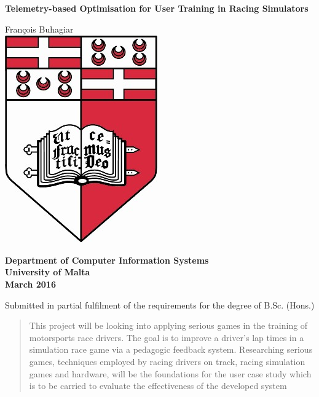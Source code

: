 \documentclass{article}
\begin{document}
\begin{titlepage}
	\begin{center}
		\begin{spacing}{1.5}
			\huge{\textbf{Telemetry-based Optimisation for User Training in Racing Simulators}}
		\end{spacing}
		
		\LARGE{François Buhagiar}
		\vspace{5mm}\\
		\includegraphics[scale=4]{images/UOM_Logo}
		
		\begin{spacing}{1.5}
			\huge{\textbf{Department of Computer Information Systems\\
			\vspace{5mm}
				University of Malta\\
				March 2016 }}
		\end{spacing}
	
		\Large \vfill Submitted in partial fulfilment of the requirements for the degree of B.Sc. (Hons.)
		\clearpage
	\end{center}
\end{titlepage}


\newpage
{} 
\setcounter{page}{1}

\newpage
\begin{abstract}
This project will be looking into applying serious games in the training of motorsports race drivers. The goal is to improve a driver's lap times in a simulation race game via a pedagogic feedback system. Researching serious games, techniques employed by racing drivers on track, racing simulation games and hardware, will be the foundations for the user case study which is to be carried to evaluate the effectiveness of the developed system
\end{abstract}
\end{document}
